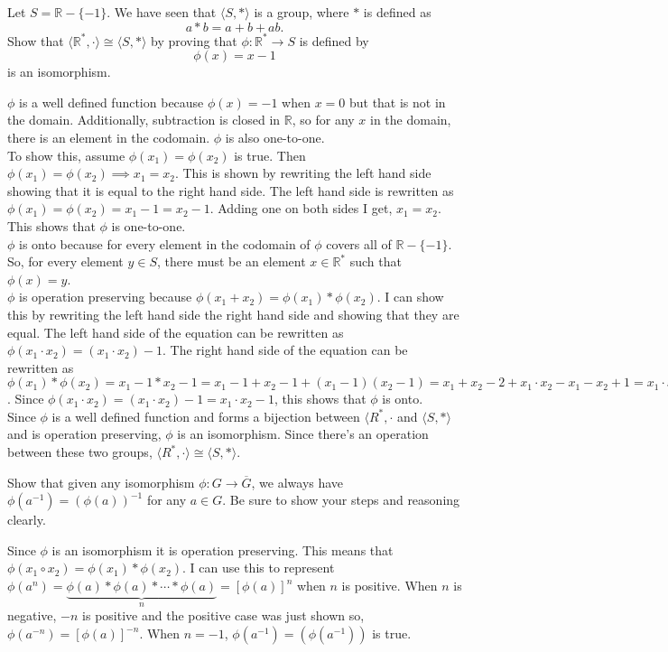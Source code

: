 \documentclass[titlepage]{article}
\newenvironment{problem}[2][Problem]{\begin{tcolorbox}\begin{trivlist}
\item[\hskip \labelsep {\bfseries #1}\hskip \labelsep {\bfseries #2.}]}{\end{trivlist}\end{tcolorbox}}
\begin{document}
\begin{problem}{9}
Let $S = \mathbb{R} - \{-1\}$. We have seen that $\langle S, * \rangle$ is a group, where $*$ is defined as
$$a*b = a+b+ab.$$
Show that $\langle \mathbb{R}^*, \cdot \rangle \cong \langle S, * \rangle$ by proving that $\phi: \mathbb{R}^* \rightarrow S$ is defined by
$$\phi(x) = x-1$$
is an isomorphism.
\end{problem}
$\phi$ is a well defined function because $\phi(x) = -1$ when $x = 0$ but that is not in the domain. Additionally, subtraction is closed in $\mathbb{R}$, so for any $x$ in the domain, there is an element in the codomain. $\phi$ is also one-to-one. 
\\
To show this, assume $\phi(x_1) = \phi(x_2)$ is true. Then $\phi(x_1) = \phi(x_2) \implies x_1 = x_2$. This is shown by rewriting the left hand side showing that it is equal to the right hand side. The left hand side is rewritten as $\phi(x_1) = \phi(x_2) = x_1 - 1 = x_2 -1$. Adding one on both sides I get, $x_1 = x_2$. This shows that $\phi$ is one-to-one. 
\\ 
$\phi$ is onto because for every element in the codomain of $\phi$ covers all of $\mathbb{R} - \{-1\}$. So, for every element $y \in S$, there must be an element $x \in \mathbb{R}^*$ such that $\phi(x) = y$.
\\
$\phi$ is operation preserving because $\phi(x_1 + x_2) = \phi(x_1) * \phi(x_2)$. I can show this by rewriting the left hand side the right hand side and showing that they are equal. The left hand side of the equation can be rewritten as $\phi(x_1 \cdot x_2) = (x_1 \cdot x_2) -1$. The right hand side of the equation can be rewritten as $\phi(x_1) * \phi(x_2) = x_1 -1 * x_2 -1 = x_1 -1 + x_2-1 + (x_1 -1)(x_2 -1) = x_1 + x_2 - 2 + x_1\cdot x_2 -x_1 -x_2 + 1 = x_1\cdot x_2 -1$. Since $\phi(x_1 \cdot x_2) = (x_1\cdot x_2) -1 = x_1 \cdot x_2 -1$, this shows that $\phi$ is onto. 
\\
Since $\phi$ is a well defined function and forms a bijection between $\langle R^*, \cdot $ and $\langle S, * \rangle$ and is operation preserving, $\phi$ is an isomorphism. Since there's an operation between these two groups, $\langle R^*, \cdot \rangle \cong \langle S, * \rangle$. 


\begin{problem}{10}
Show that given any isomorphism $\phi:G\rightarrow \overline{G}$, we always have $\phi(a^{-1}) = (\phi(a))^{-1}$ for any $a\in G$. Be sure to show your steps and reasoning clearly.
\end{problem}
Since $\phi$ is an isomorphism it is operation preserving. This means that $\phi(x_1 \circ x_2) = \phi(x_1) * \phi(x_2)$. I can use this to represent $\phi(a^n) = \underbrace{\phi(a) * \phi(a) *  \cdots * \phi(a)}_{n} = [\phi(a)]^n$ when $n$ is positive. When $n$ is negative, $-n$ is positive and the positive case was just shown so, $\phi(a^{-n}) = [\phi(a)]^{-n}$. When $n = -1$, $\phi(a^{-1}) = (\phi(a^{-1}))$ is true.
\end{document}
